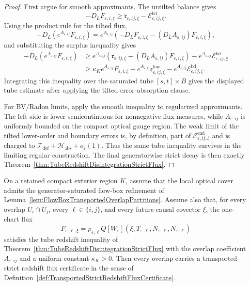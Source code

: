 \begin{proof}
First argue for smooth approximants.  The untilted balance gives
\[
    -D_LF_{\varepsilon,i,\xi}
    \ge
    \mathfrak r_{\varepsilon,ij,\xi}
    -
    \mathcal E^{\mathrm{bd}}_{\varepsilon,ij,\xi}.
\]
Using the product rule for the tilted flux,
\[
    -D_L\!\left(e^{A_{\varepsilon,ij}}F_{\varepsilon,i,\xi}\right)
    =
    e^{A_{\varepsilon,ij}}
    \left(
        -D_LF_{\varepsilon,i,\xi}
        -
        (D_LA_{\varepsilon,ij})F_{\varepsilon,i,\xi}
    \right),
\]
and substituting the surplus inequality gives
\[
\begin{split}
    -D_L\!\left(e^{A_{\varepsilon,ij}}F_{\varepsilon,i,\xi}\right)
    &\ge
    e^{A_{\varepsilon,ij}}
    \left(
        \mathfrak r_{\varepsilon,ij,\xi}
        -
        (D_LA_{\varepsilon,ij})F_{\varepsilon,i,\xi}
    \right)
    -
    e^{A_{\varepsilon,ij}}\mathcal E^{\mathrm{bd}}_{\varepsilon,ij,\xi}\\
    &\ge
    \kappa_K e^{A_{\varepsilon,ij}}F_{\varepsilon,i,\xi}
    -
    e^{A_{\varepsilon,ij}}\mathfrak e^{\mathrm{low}}_{\varepsilon,ij,\xi}
    -
    e^{A_{\varepsilon,ij}}\mathcal E^{\mathrm{bd}}_{\varepsilon,ij,\xi}.
\end{split}
\]
Integrating this inequality over the saturated tube $[s,t]\times B$ gives the displayed tube estimate after applying the tilted error-absorption clause.

For BV/Radon limits, apply the smooth inequality to regularized approximants.  The left side is lower semicontinuous for nonnegative flux measures, while $A_{\varepsilon,ij}$ is uniformly bounded on the compact optical gauge region.  The weak limit of the tilted lower-order and boundary errors is, by definition, part of
$\mathcal E^{\mathrm{end}}_{\varepsilon,ij,\xi}$ and is charged to
$\mathcal T_{\mathrm{def}}+\mathcal H_{\mathrm{abs}}+o_\varepsilon(1)$.  Thus the same tube inequality survives in the limiting regular construction.  The final generatorwise strict decay is then exactly Theorem~\ref{thm:TubeRedshiftDisintegrationStrictFlux}.
\end{proof}

\begin{theorem}\label{thm:FlowBoxTubeRedshiftStrictCertificate}
On a retained compact exterior region $K$, assume that the local optical cover admits the generator-saturated flow-box refinement of Lemma~\ref{lem:FlowBoxTransportedOverlapPartitions}.  Assume also that, for every overlap $U_i\cap U_j$, every $\ell\in\{i,j\}$, and every future causal covector $\xi$, the one-chart flux
\[
    F_{\varepsilon,\ell,\xi}
    =
    \rho_{\varepsilon,\ell}
    Q[W_\varepsilon](\xi,T_{\varepsilon,\ell},N_{\varepsilon,\ell},N_{\varepsilon,\ell})
\]
satisfies the tube redshift inequality of Theorem~\ref{thm:TubeRedshiftDisintegrationStrictFlux} with the overlap coefficient $A_{\varepsilon,ij}$ and a uniform constant $\kappa_K>0$.  Then every overlap carries a transported strict redshift flux certificate in the sense of Definition~\ref{def:TransportedStrictRedshiftFluxCertificate}.
\end{theorem}

